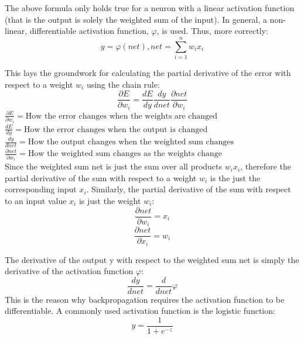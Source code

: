 \documentclass[a4paper,12pt]{article}
\begin{document}
The above formula only holds true for a neuron with a linear activation function (that is the output is solely the weighted sum of the input). In general, a non-linear, differentiable activation function, $\varphi$, is used. Thus, more correctly:
\begin{equation}
 	y = \varphi(net), 
	net = \sum_{i=1}^{n}w_ix_i
\end{equation}

This lays the groundwork for calculating the partial derivative of the error with respect to a weight $w_i$ using the chain rule:
\begin{equation}
 	\frac{\partial E}{\partial w_i} = \frac{dE}{dy} \frac{dy}{dnet} \frac{\partial net}{\partial w_i}
\end{equation}
	$\frac{\partial E}{\partial w_i} = \text{How the error changes when the weights are changed}$\\
	$\frac{dE}{dy} = \text{How the error changes when the output is changed}$\\
	$\frac{dy}{dnet} = \text{How the output changes when the weighted sum changes}$\\
	$\frac{\partial net}{\partial w_i} = \text{How the weighted sum changes as the weights change}$\\

Since the weighted sum net is just the sum over all products $w_i x_i$, therefore the partial derivative of the sum with respect to a weight $w_i$ is the just the corresponding input $x_i$. Similarly, the partial derivative of the sum with respect to an input value $x_i$ is just the weight $w_i$:
\begin{equation}
 	\frac{\partial net}{\partial w_i} = x_i
\end{equation}
\begin{equation}
	\frac{\partial net}{\partial x_i} = w_i
\end{equation}

The derivative of the output y with respect to the weighted sum net is simply the derivative of the activation function $\varphi$:
\begin{equation}
     \frac{dy}{dnet} = \frac{d}{dnet}\varphi 
\end{equation}
This is the reason why backpropagation requires the activation function to be differentiable. A commonly used activation function is the logistic function:
\begin{equation}
    y = \frac{1}{1+e^{-z}}
\end{equation}
\end{document}

